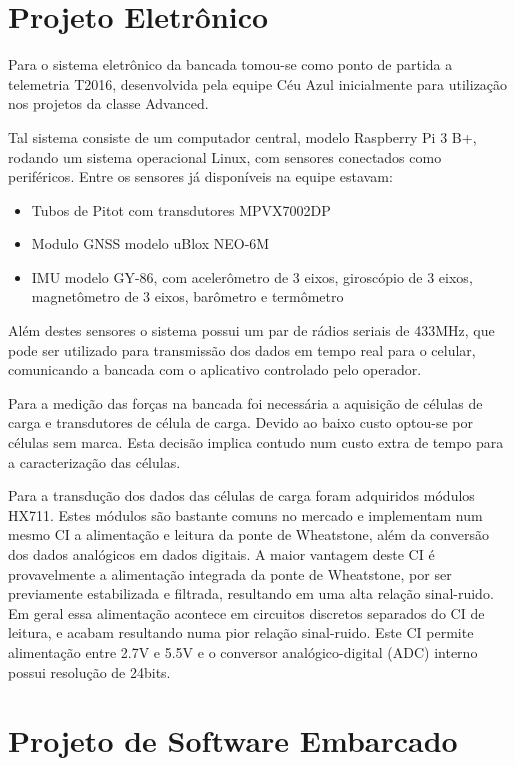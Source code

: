 \section{Projeto Eletrônico}

Para o sistema eletrônico da bancada tomou-se como ponto de partida a telemetria T2016, desenvolvida pela equipe Céu Azul inicialmente para utilização nos projetos da classe Advanced.

Tal sistema consiste de um computador central, modelo Raspberry Pi 3 B+, rodando um sistema operacional Linux, com sensores conectados como periféricos. Entre os sensores já disponíveis na equipe estavam:

\begin{itemize}
    \item Tubos de Pitot com transdutores MPVX7002DP
    \item Modulo GNSS modelo uBlox NEO-6M
    \item IMU modelo GY-86, com acelerômetro de 3 eixos, giroscópio de 3 eixos, magnetômetro de 3 eixos, barômetro e termômetro
\end{itemize}

Além destes sensores o sistema possui um par de rádios seriais de 433MHz, que pode ser utilizado para transmissão dos dados em tempo real para o celular, comunicando a bancada com o aplicativo controlado pelo operador.

Para a medição das forças na bancada foi necessária a aquisição de células de carga e transdutores de célula de carga. Devido ao baixo custo optou-se por células sem marca. Esta decisão implica contudo num custo extra de tempo para a caracterização das células.

Para a transdução dos dados das células de carga foram adquiridos módulos HX711. Estes módulos são bastante comuns no mercado e implementam num mesmo CI a alimentação e leitura da ponte de Wheatstone, além da conversão dos dados analógicos em dados digitais. A maior vantagem deste CI é provavelmente a alimentação integrada da ponte de Wheatstone, por ser previamente estabilizada e filtrada, resultando em uma alta relação sinal-ruido. Em geral essa alimentação acontece em circuitos discretos separados do CI de leitura, e acabam resultando numa pior relação sinal-ruido. Este CI permite alimentação entre 2.7V e 5.5V e o conversor analógico-digital (ADC) interno possui resolução de 24bits.

\section{Projeto de Software Embarcado}

